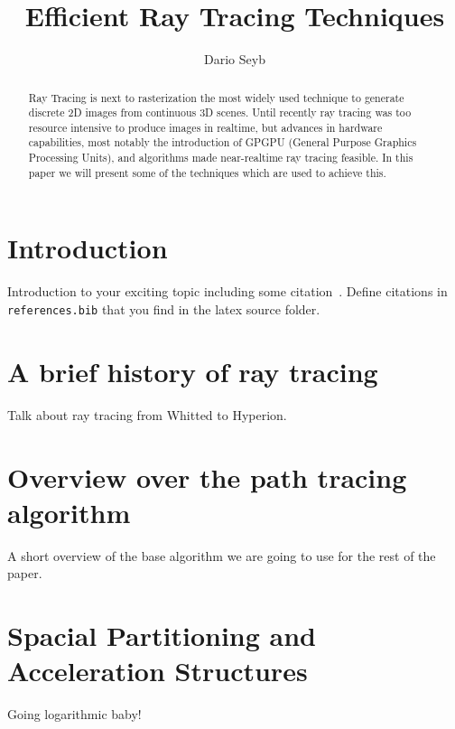 \documentclass{ACGSeminar}
\begin{document}
\title{Efficient Ray Tracing Techniques}

\author{Dario Seyb}

\maketitle


\begin{abstract}%
Ray Tracing is next to rasterization the most widely used technique to generate discrete 2D images from continuous 3D scenes. Until recently ray tracing was too resource intensive to produce images in realtime, but advances in hardware capabilities, most notably the introduction of GPGPU (General Purpose Graphics Processing Units), and algorithms made near-realtime ray tracing feasible. In this paper we will present some of the techniques which are used to achieve this.
\end{abstract}

\tableofcontents


\section{Introduction}

Introduction to your exciting topic including
some citation~\cite{Pharr:2010:PBR:1854996}. Define citations
in \verb+references.bib+ that you find in
the latex source folder.


\section{A brief history of ray tracing}
Talk about ray tracing from Whitted to Hyperion.

\section{Overview over the path tracing algorithm}
A short overview of the base algorithm we are going to use for the rest of the paper.

\section{Spacial Partitioning and Acceleration Structures}
Going logarithmic baby!
\end{document}
